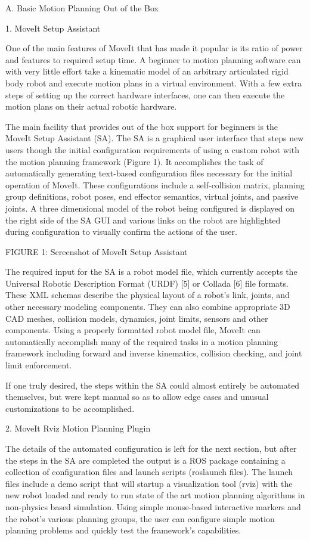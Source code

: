 \documentclass[10pt,journal,compsoc]{joser1}
\begin{document}
{A. Basic Motion Planning Out of the Box

1. MoveIt Setup Assistant

One of the main features of MoveIt that has made it popular is its ratio of power and features to required setup time. A beginner to motion planning software can with very little effort take a kinematic model of an arbitrary articulated rigid body robot and execute motion plans in a virtual environment. With a few extra steps of setting up the correct hardware interfaces, one can then execute the motion plans on their actual robotic hardware.

The main facility that provides out of the box support for beginners is the MoveIt Setup Assistant (SA). The SA is a graphical user interface that steps new users though the initial configuration requirements of using a custom robot with the motion planning framework (Figure 1). It accomplishes the task of automatically generating text-based configuration files necessary for the initial operation of MoveIt. These configurations include a self-collision matrix, planning group definitions, robot poses, end effector semantics, virtual joints, and passive joints. A three dimensional model of the robot being configured is displayed on the right side of the SA GUI and various links on the robot are highlighted during configuration to visually confirm the actions of the user.

FIGURE 1: Screenshot of MoveIt Setup Assistant

The required input for the SA is a robot model file, which currently accepts the Universal Robotic Description Format (URDF) [5] or Collada [6] file formats. These XML schemas describe the physical layout of a robot's link, joints, and other necessary modeling components. They can also combine appropriate 3D CAD meshes, collision models, dynamics, joint limits, sensors and other components. Using a properly formatted robot model file, MoveIt can automatically accomplish many of the required tasks in a motion planning framework including forward and inverse kinematics, collision checking, and joint limit enforcement.

If one truly desired, the steps within the SA could almost entirely be automated themselves, but were kept manual so as to allow edge cases and unusual customizations to be accomplished.

2. MoveIt Rviz Motion Planning Plugin

The details of the automated configuration is left for the next section, but after the steps in the SA are completed the output is a ROS package containing a collection of configuration files and launch scripts (roslaunch files). The launch files include a demo script that will startup a visualization tool (rviz) with the new robot loaded and ready to run state of the art motion planning algorithms in non-physics based simulation. Using simple mouse-based interactive markers and the robot's various planning groups, the user can configure simple motion planning problems and quickly test the framework's capabilities.  

}
\end{document}
